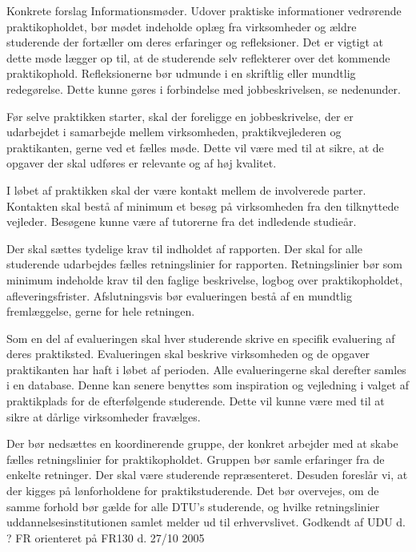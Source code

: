 Konkrete forslag
 Informationsmøder. Udover praktiske informationer vedrørende praktikopholdet, bør mødet indeholde oplæg
fra virksomheder og ældre studerende der fortæller om deres erfaringer og refleksioner. Det er vigtigt at dette
møde lægger op til, at de studerende selv reflekterer over det kommende praktikophold. Refleksionerne bør
udmunde i en skriftlig eller mundtlig redegørelse. Dette kunne gøres i forbindelse med jobbeskrivelsen, se
nedenunder.
\begin{list}{•}
\item Før selve praktikken starter, skal der foreligge en jobbeskrivelse, der er udarbejdet i samarbejde mellem
    virksomheden, praktikvejlederen og praktikanten, gerne ved et fælles møde. Dette vil være med til at sikre, at
      de opgaver der skal udføres er relevante og af høj kvalitet.
      \item I løbet af praktikken skal der være kontakt mellem de involverede parter. Kontakten skal bestå af minimum et
      besøg på virksomheden fra den tilknyttede vejleder. Besøgene kunne være af tutorerne fra det indledende
         studieår.
         \item Der skal sættes tydelige krav til indholdet af rapporten. Der skal for alle studerende udarbejdes fælles
     retningslinier for rapporten. Retningslinier bør som minimum indeholde krav til den faglige beskrivelse,
     logbog over praktikopholdet, afleveringsfrister. Afslutningsvis bør evalueringen bestå af en mundtlig
      fremlæggelse, gerne for hele retningen.
      \item Som en del af evalueringen skal hver studerende skrive en specifik evaluering af deres praktiksted.
   Evalueringen skal beskrive virksomheden og de opgaver praktikanten har haft i løbet af perioden. Alle
   evalueringerne skal derefter samles i en database. Denne kan senere benyttes som inspiration og vejledning i
  valget af praktikplads for de efterfølgende studerende. Dette vil kunne være med til at sikre at dårlige
    virksomheder fravælges.
\end{list}

Der bør nedsættes en koordinerende gruppe, der konkret arbejder med at skabe fælles retningslinier for praktikopholdet.
Gruppen bør samle erfaringer fra de enkelte retninger. Der skal være studerende repræsenteret.
Desuden foreslår vi, at der kigges på lønforholdene for praktikstuderende. Det bør overvejes, om de samme forhold bør
gælde for alle DTU’s studerende, og hvilke retningslinier uddannelsesinstitutionen samlet melder ud til erhvervslivet.
Godkendt af UDU d. ?
FR orienteret på FR130 d. 27/10 2005

